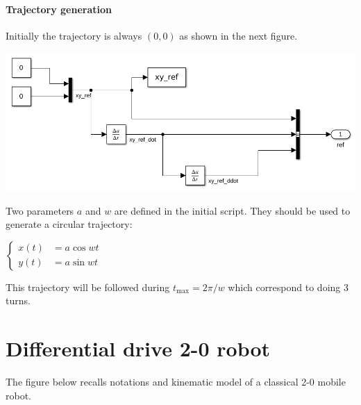 \documentclass{ecnreport}
\begin{document}
\paragraph{Trajectory generation} Initially the trajectory is always $(0,0)$ as shown in the next figure.
\begin{center}
 \includegraphics[width=.6\linewidth]{traj}
\end{center}
Two parameters $a$ and $w$ are defined in the initial script. They should be used to generate a circular trajectory:
\begin{center}
 $\left\{\begin{array}{ll}
          x(t) &= a\cos wt \\ y(t) &= a\sin wt \end{array}\right.$
\end{center}This trajectory will be followed during $t_{\max} = 2\pi/w$ which correspond to doing 3 turns.

\newpage

\section{Differential drive 2-0 robot}

The figure below recalls notations and kinematic model of a classical 2-0 mobile robot.
\end{document}
